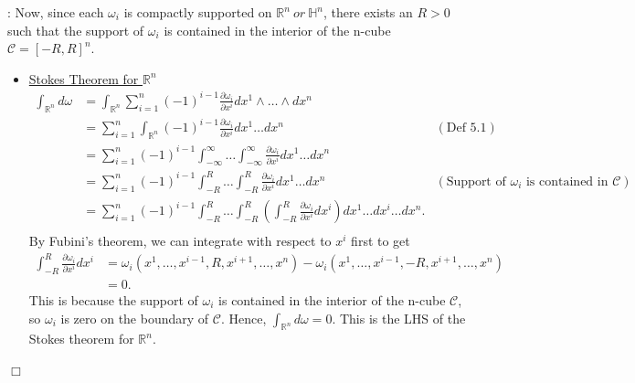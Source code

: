 \documentclass{article}
\def\endproofmark{$\Box$}
\newenvironment{proof}{\par\noindent{\bf Proof}:}{\endproofmark\smallskip}
\begin{document}
\begin{proof}
    Now, since each $\omega_i$ is compactly supported on $\mathbb{R}^n \ or \ \mathbb{H}^n$, there exists an $R > 0$ such that the support of $\omega_i$ is contained in the interior of the n-cube $\mathcal{C} = [-R, R]^n$. 
    \begin{itemize}
        \item \underline{Stokes Theorem for $\mathbb{R}^n$}
        \begin{align*}
            \int_{\mathbb{R}^n} d\omega &= \int_{\mathbb{R}^n} \sum_{i=1}^n (-1)^{i-1} \frac{\partial \omega_i}{\partial x^i} dx^1 \wedge \ldots \wedge dx^n \\
            &= \sum_{i=1}^n \int_{\mathbb{R}^n}  (-1)^{i-1} \frac{\partial \omega_i}{\partial x^i} dx^1 \ldots dx^n & (\text{Def 5.1}) \\
            &= \sum_{i=1}^n (-1)^{i-1} \int_{-\infty}^{\infty} \ldots \int_{-\infty}^{\infty}  \frac{\partial \omega_i}{\partial x^i} dx^1 \ldots dx^n \\
            &= \sum_{i=1}^n (-1)^{i-1}\int_{-R}^R \ldots \int_{-R}^R  \frac{\partial \omega_i}{\partial x^i} dx^1 \ldots dx^n & (\text{Support of } \omega_i \text{ is contained in } \mathcal{C}) \\
            &= \sum_{i=1}^n (-1)^{i-1} \int_{-R}^R \ldots \int_{-R}^R  \left(
                \int_{-R}^{R} \frac{\partial \omega_i}{\partial x^i} dx^i
            \right) dx^1 \ldots \widehat{dx^i} \ldots dx^n .\\
        \end{align*}
        By Fubini's theorem, we can integrate with respect to $x^i$ first to get
        \begin{align*}
            \int_{-R}^{R} \frac{\partial \omega_i}{\partial x^i} dx^i &= \omega_i(x^1, \ldots, x^{i-1}, R, x^{i+1}, \ldots, x^n) - \omega_i(x^1, \ldots, x^{i-1}, -R, x^{i+1}, \ldots, x^n) \\
            &= 0.
        \end{align*}
        This is because the support of $\omega_i$ is contained in the interior of the n-cube $\mathcal{C}$, so $\omega_i$ is zero on the boundary of $\mathcal{C}$. Hence, $\int_{\mathbb{R}^n} d\omega = 0$. This is the LHS of the Stokes theorem for $\mathbb{R}^n$.


\end{itemize}
\end{proof}
\end{document}
